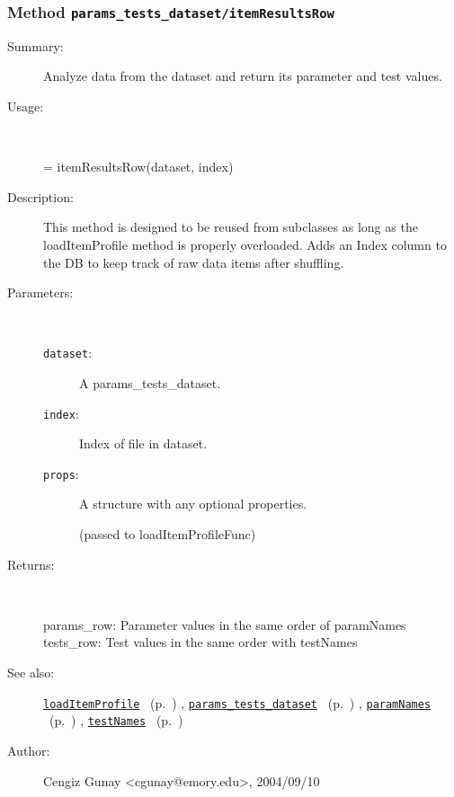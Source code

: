 \subsubsection[Method \texttt{itemResultsRow}]{Method \texttt{params\_tests\_dataset/itemResultsRow}}%
%
\label{ref_params_tests_dataset__itemResultsRow}%
\hypertarget{ref_params_tests_dataset__itemResultsRow}{}%
\begin{description}
\item[Summary:]Analyze data from the dataset and return its parameter and test values.
%
\item[Usage:]~%
\begin{lyxcode}%
[params\_row, tests\_row] = itemResultsRow(dataset, index)
%
\end{lyxcode}%
%
\item[Description:]%
This method is designed to be reused from subclasses as long as the
 loadItemProfile method is properly overloaded. Adds an Index
 column to the DB to keep track of raw data items after shuffling.
\item[Parameters:]~
\begin{description}%
\item[\texttt{dataset}:]
 A params\_tests\_dataset.
\item[\texttt{index}:]
 Index of file in dataset.
\item[\texttt{props}:]
 A structure with any optional properties.

(passed to loadItemProfileFunc)
\end{description}%
%
\item[Returns:
]~

   params\_row: Parameter values in the same order of paramNames
   tests\_row: Test values in the same order with testNames
%
%
\item[See also:]%
\hyperlink{ref_loadItemProfile}{\texttt{loadItemProfile}}%
\ (p.~\pageref{ref_loadItemProfile})%
%
, \hyperlink{ref_params_tests_dataset}{\texttt{params\_tests\_dataset}}%
\ (p.~\pageref{ref_params_tests_dataset})%
%
, \hyperlink{ref_paramNames}{\texttt{paramNames}}%
\ (p.~\pageref{ref_paramNames})%
%
, \hyperlink{ref_testNames}{\texttt{testNames}}%
\ (p.~\pageref{ref_testNames})%
%
%
\item[Author:]%
Cengiz Gunay <cgunay@emory.edu>, 2004/09/10
%
\end{description}
\methodline%
